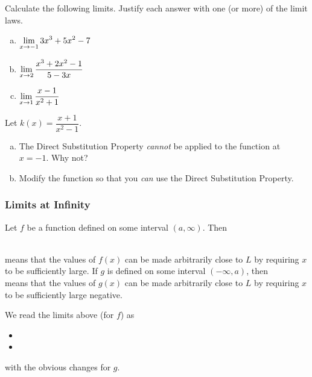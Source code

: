 \documentclass[notes]{subfiles}
\begin{document}
		\begin{ex}
			Calculate the following limits.  Justify each answer with one (or more) of the limit laws.
			\begin{enumerate}[(a)]
				\item \(\displaystyle \lim_{x\to -1} 3x^3+5x^2-7\)
					\newpage
					
				\item \(\displaystyle \lim_{x\to 2} \dfrac{x^3+2x^2-1}{5-3x}\)
					
				\item \(\displaystyle \lim_{x\to 1} \dfrac{x-1}{x^2+1}\)
					
			\end{enumerate}
		\end{ex}

		\begin{question}
			Let \(k(x) = \dfrac{x+1}{x^2-1}\).
			\begin{enumerate}[(a)]
				\item The Direct Substitution Property \emph{cannot} be applied to the function at \(x = -1\).  Why not?
					
				\item Modify the function so that you \emph{can} use the Direct Substitution Property.
			\end{enumerate}
		\end{question} 
			\newpage
			
	\subsubsection*{Limits at Infinity}
		\begin{defn}
			Let \(f\) be a function defined on some interval \((a,\infty)\).  Then

					\\[40pt] \(\) \\
				
			means that the values of \(f(x)\) can be made arbitrarily close to \(L\) by requiring \(x\) to be sufficiently large.  If \(g\) is defined on some interval \((-\infty,a)\), then
					\\[50pt] \(\) \\
			means that the values of \(g(x)\) can be made arbitrarily close to \(L\) by requiring \(x\) to be sufficiently large negative.
		\end{defn}
			
		We read the limits above (for \(f\)) as
			\begin{itemize}
			\setlength\itemsep{40pt}
				\item 
				\item 
			\end{itemize}
			\vspace*{.1in}
		with the obvious changes for \(g\). 
\end{document}
